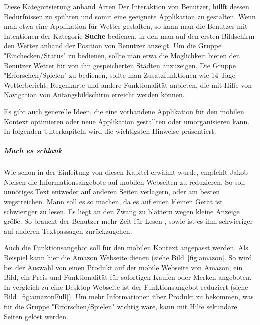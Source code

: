 Diese Kategorisierung anhand Arten Der Interaktion von Benutzer, hillft dessen Bedürfnissen zu spühren und somit eine geeignete Applikation zu gestalten. Wenn man etwa eine Applikation für Wetter gestalten, so kann man die Benutzer mit Intentionen der Kategorie \textbf{Suche} bedienen, in den man auf den ersten Bildschirm den Wetter anhand der Position von Benutzer anzeigt. Um die Gruppe "Einchecken/Status" zu bedienen, sollte man etwa die Möglichkeit bieten den Benutzer Wetter für von ihn gespeicherten Städten anzuzeigen. Die Gruppe "Erforschen/Spielen" zu bedienen, sollte man Zusatzfunktionen wie 14 Tage Wetterbericht, Regenkarte und andere Funktionalität anbieten, die mit Hilfe von Navigation von Anfangsbildschirm erreicht werden können.

Es gibt auch generelle Ideen, die eine vorhandene Applikation für den mobilen Kontext optimieren oder neue Applikation gestallten oder umorganisieren kann. In folgenden Unterkapiteln wird die wichtigsten Hinweise präsentiert. 

\subparagraph{Mach es schlank} 
\label{subp:entferne_das_fett}

Wie schon in der Einleitung von diesen Kapitel erwähnt wurde, empfehlt Jakob Nielsen die Informationsangebote auf mobilen Webseiten zu reduzieren. So soll unnötiges Text entweder auf anderen Seiten verlagern, oder am besten wegstreichen. Mann soll es so machen, da es auf einen kleinen Gerät ist schwieriger zu lesen\cite[Seite 102]{Nielsen:2012wj}. Es liegt an den Zwang zu blättern wegen kleine Anzeige größe. So braucht der Benutzer mehr Zeit für Lesen , sowie ist es ihm schwieriger auf anderen Textpassagen zurückzugehen.

Auch die Funktionsangebot soll für den mobilen Kontext angepasst werden. Als Beispiel kann hier die Amazon Webseite dienen (siehe Bild~\ref{fig:amazon}. So wird bei der Auswahl von einen Produkt auf der mobile Webseite von Amazon, ein Bild, ein Preis und Funktionalität für sofortigen Kaufen oder Merken angeboten. In vergleich zu eine Desktop Webseite ist der Funktionsangebot reduziert (siehe Bild~\ref{fig:amazonFull}). Um mehr Informationen über Produkt zu bekommen, was für die Gruppe "Erforschen/Spielen" wichtig wäre, kann mit Hilfe sekundäre Seiten gelöst werden.

